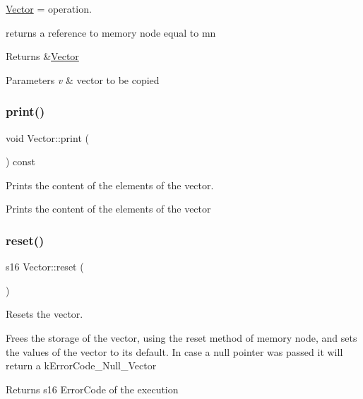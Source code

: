 \hyperlink{class_vector}{Vector} = operation. 

returns a reference to memory node equal to mn

\begin{DoxyReturn}{Returns}
\&\hyperlink{class_vector}{Vector} 
\end{DoxyReturn}

\begin{DoxyParams}{Parameters}
{\em v} & vector to be copied \\
\hline
\end{DoxyParams}
\mbox{\label{class_vector_aa9d204c1e8c6f232e5391ebc57e8edd2}} 
\subsubsection{\texorpdfstring{print()}{print()}}
{\footnotesize\ttfamily void Vector\+::print (\begin{DoxyParamCaption}{ }\end{DoxyParamCaption}) const}



Prints the content of the elements of the vector. 

Prints the content of the elements of the vector \mbox{\label{class_vector_abdb3654bb23bc4f7bd0158a3a30a1019}} 
\subsubsection{\texorpdfstring{reset()}{reset()}}
{\footnotesize\ttfamily s16 Vector\+::reset (\begin{DoxyParamCaption}{ }\end{DoxyParamCaption})}



Resets the vector. 

Frees the storage of the vector, using the reset method of memory node, and sets the values of the vector to it\textquotesingle{}s default. In case a null pointer was passed it will return a k\+Error\+Code\+\_\+\+Null\+\_\+\+Vector

\begin{DoxyReturn}{Returns}
s16 Error\+Code of the execution 
\end{DoxyReturn}
\mbox{\label{class_vector_a3477707e55ad541292ae26b1c8645819}} 
